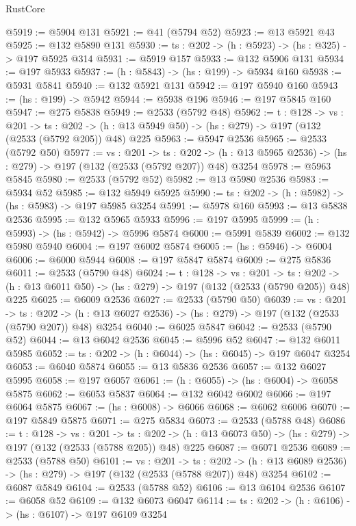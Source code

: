 \begin{lexlean}{RustCore}
\begin{coremodule}
@5919 := @5904 @131
@5921 := @41 (@5794 @52)
@5923 := @13 @5921 @43
@5925 := @132 @5890 @131
@5930 := {ts : @202} -> (h : @5923) -> (hs : @325) -> @197 @5925 @314
@5931 := @5919 @157
@5933 := @132 @5906 @131
@5934 := @197 @5933
@5937 := (h : @5843) -> (hs : @199) -> @5934 @160
@5938 := @5931 @5841
@5940 := @132 @5921 @131
@5942 := @197 @5940 @160
@5943 := (hs : @199) -> @5942
@5944 := @5938 @196
@5946 := @197 @5845 @160
@5947 := @275 @5838
@5949 := @2533 (@5792 @48)
@5962 := {t : @128} ->
  {vs : @201} ->
  {ts : @202} -> (h : @13 @5949 @50) -> (hs : @279) -> @197 (@132 (@2533 (@5792 @205)) @48) @225
@5963 := @5947 @2536
@5965 := @2533 (@5792 @50)
@5977 := {vs : @201} ->
  {ts : @202} -> (h : @13 @5965 @2536) -> (hs : @279) -> @197 (@132 (@2533 (@5792 @207)) @48) @3254
@5978 := @5963 @5845
@5980 := @2533 (@5792 @52)
@5982 := @13 @5980 @2536
@5983 := @5934 @52
@5985 := @132 @5949 @5925
@5990 := {ts : @202} -> (h : @5982) -> (hs : @5983) -> @197 @5985 @3254
@5991 := @5978 @160
@5993 := @13 @5838 @2536
@5995 := @132 @5965 @5933
@5996 := @197 @5995
@5999 := (h : @5993) -> (hs : @5942) -> @5996 @5874
@6000 := @5991 @5839
@6002 := @132 @5980 @5940
@6004 := @197 @6002 @5874
@6005 := (hs : @5946) -> @6004
@6006 := @6000 @5944
@6008 := @197 @5847 @5874
@6009 := @275 @5836
@6011 := @2533 (@5790 @48)
@6024 := {t : @128} ->
  {vs : @201} ->
  {ts : @202} -> (h : @13 @6011 @50) -> (hs : @279) -> @197 (@132 (@2533 (@5790 @205)) @48) @225
@6025 := @6009 @2536
@6027 := @2533 (@5790 @50)
@6039 := {vs : @201} ->
  {ts : @202} -> (h : @13 @6027 @2536) -> (hs : @279) -> @197 (@132 (@2533 (@5790 @207)) @48) @3254
@6040 := @6025 @5847
@6042 := @2533 (@5790 @52)
@6044 := @13 @6042 @2536
@6045 := @5996 @52
@6047 := @132 @6011 @5985
@6052 := {ts : @202} -> (h : @6044) -> (hs : @6045) -> @197 @6047 @3254
@6053 := @6040 @5874
@6055 := @13 @5836 @2536
@6057 := @132 @6027 @5995
@6058 := @197 @6057
@6061 := (h : @6055) -> (hs : @6004) -> @6058 @5875
@6062 := @6053 @5837
@6064 := @132 @6042 @6002
@6066 := @197 @6064 @5875
@6067 := (hs : @6008) -> @6066
@6068 := @6062 @6006
@6070 := @197 @5849 @5875
@6071 := @275 @5834
@6073 := @2533 (@5788 @48)
@6086 := {t : @128} ->
  {vs : @201} ->
  {ts : @202} -> (h : @13 @6073 @50) -> (hs : @279) -> @197 (@132 (@2533 (@5788 @205)) @48) @225
@6087 := @6071 @2536
@6089 := @2533 (@5788 @50)
@6101 := {vs : @201} ->
  {ts : @202} -> (h : @13 @6089 @2536) -> (hs : @279) -> @197 (@132 (@2533 (@5788 @207)) @48) @3254
@6102 := @6087 @5849
@6104 := @2533 (@5788 @52)
@6106 := @13 @6104 @2536
@6107 := @6058 @52
@6109 := @132 @6073 @6047
@6114 := {ts : @202} -> (h : @6106) -> (hs : @6107) -> @197 @6109 @3254

\end{coremodule}
\end{lexlean}
